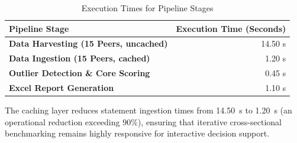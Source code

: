 \begin{table}[H]
    \centering
    \caption{Execution Times for Pipeline Stages}
    \label{tab:perf_metrics}
    \begin{tabular}{>{\bfseries}lr}
        \toprule
        \textbf{Pipeline Stage} & \textbf{Execution Time (Seconds)} \\
        \midrule
        Data Harvesting (15 Peers, uncached) & 14.50 s \\
        Data Ingestion (15 Peers, cached) & 1.20 s \\
        Outlier Detection \& Core Scoring & 0.45 s \\
        Excel Report Generation & 1.10 s \\
        \bottomrule
    \end{tabular}
\end{table}

The caching layer reduces statement ingestion times from 14.50~s to 1.20~s (an operational reduction exceeding $90\%$), ensuring that iterative cross-sectional benchmarking remains highly responsive for interactive decision support.
